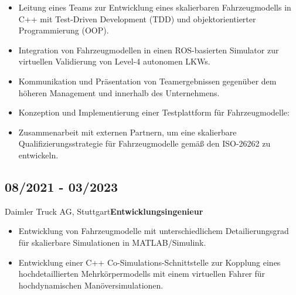\documentclass{mycv}
\begin{document}
\begin{paracol}{2}
{\begin{itemize}
            \item Leitung eines Teams zur Entwicklung eines skalierbaren
                Fahrzeugmodells in C++ mit Test-Driven Development (TDD) und
                objektorientierter Programmierung (OOP).

            \item Integration von Fahrzeugmodellen in einen ROS-basierten
                Simulator zur virtuellen Validierung von Level-4 autonomen LKWs. 
            
            \item Kommunikation und Pr{\"a}sentation von Teamergebnissen
                gegen{\"u}ber dem h{\"o}heren Management und innerhalb des
                Unternehmens.

            \item Konzeption und Implementierung einer Testplattform für Fahrzeugmodelle:

            \item Zusammenarbeit mit externen Partnern, um eine skalierbare
                Qualifizierungsstrategie für Fahrzeugmodelle gem{\"a}{\ss} den
                ISO-26262 zu entwickeln.


          \end{itemize}
     
          \subsection{08/2021 - 03/2023}{Daimler Truck AG, Stuttgart}{{\bfseries Entwicklungsingenieur}}
           \begin{itemize}
               \item Entwicklung von Fahrzeugmodelle mit unterschiedlichem
                   Detailierungsgrad f{\"u}r skalierbare Simulationen in MATLAB/Simulink.

               \item Entwicklung einer C++ Co-Simulations-Schnittstelle zur
                   Kopplung eines hochdetaillierten Mehrk{\"o}rpermodells mit
                   einem virtuellen Fahrer für hochdynamischen
                   Man{\"o}versimulationen.
           \end{itemize}

}
\end{paracol}
\end{document}
